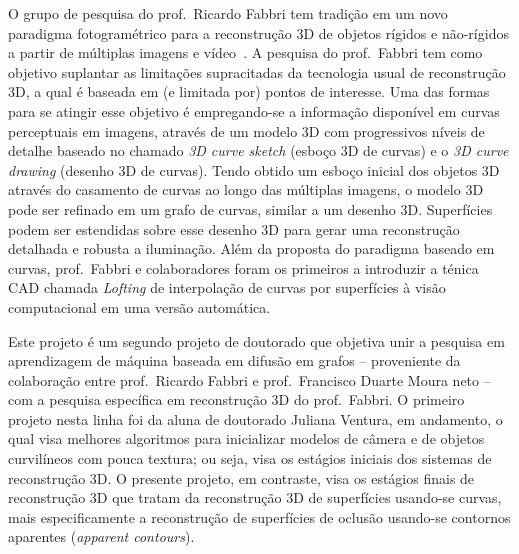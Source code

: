 \documentclass[a4paper,titlepage]{article}
\begin{document}
O grupo de pesquisa do prof.\ Ricardo Fabbri tem tradição em um novo paradigma
fotogramétrico para a reconstrução 3D de objetos rígidos e não-rígidos a partir
de múltiplas imagens e
vídeo~\cite{Fabbri:Kimia:IJCV2016,Fabbri:PhD:2010,Fabbri:Giblin:Kimia:ECCV12,Fabbri:Kimia:EMMCVPR2005,Fabbri:Kimia:CVPR10,Usumezbas:Fabbri:Kimia:CVPR:2017,Usumezbas:Fabbri:Kimia:ECCV16}.
A pesquisa do prof.\ Fabbri tem como objetivo suplantar as limitações
supracitadas da tecnologia usual de reconstrução 3D, a qual é baseada em (e
limitada por) pontos de interesse. Uma das formas para se atingir esse objetivo
é empregando-se a informação disponível em curvas perceptuais em imagens,
através de um modelo 3D com progressivos níveis de detalhe baseado no chamado
\emph{3D curve sketch} (esboço 3D de curvas) e o \emph{3D curve drawing}
(desenho 3D de curvas). Tendo obtido um esboço inicial dos objetos 3D através do
casamento de curvas ao longo das múltiplas imagens, o modelo 3D pode ser
refinado em um grafo de curvas, similar a um desenho 3D. Superfícies podem ser
estendidas sobre esse desenho 3D para gerar uma reconstrução detalhada e
robusta a iluminação. Além da proposta do paradigma baseado em curvas, prof.\
Fabbri e colaboradores foram os primeiros a introduzir a ténica
CAD chamada \emph{Lofting} de interpolação de curvas por superfícies à visão
computacional em uma versão automática.

Este projeto é um segundo projeto de doutorado que objetiva unir a pesquisa em
aprendizagem de máquina baseada em difusão em grafos -- proveniente da
colaboração entre prof.\ Ricardo Fabbri e prof.\ Francisco
Duarte Moura neto --  com a pesquisa específica em reconstrução 3D do prof.\
Fabbri. O primeiro projeto nesta linha foi da aluna de doutorado Juliana
Ventura, em andamento, o qual visa melhores algoritmos para inicializar modelos
de câmera e de objetos curvilíneos com pouca textura; ou seja, visa os estágios
iniciais dos sistemas de reconstrução 3D. O presente projeto, em
contraste, visa os estágios finais de reconstrução 3D que tratam da reconstrução
3D de superfícies usando-se curvas, mais especificamente a reconstrução de
superfícies de oclusão usando-se contornos aparentes (\emph{apparent contours}).
\end{document}
